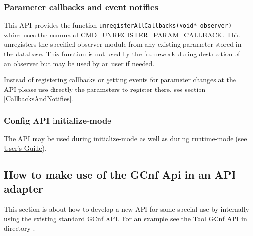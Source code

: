 \subsubsection{Parameter callbacks and event notifies}

This API provides the function \lstinline|unregisterAllCallbacks(void* observer)| which uses the \GreenControl command CMD\_UNREGISTER\_PARAM\_CALLBACK. This unregisters the specified observer module from any existing parameter stored in the database. This function is not used by the framework during destruction of an observer but may be used by an user if needed.

 Instead of registering callbacks or getting events for parameter changes at the \GreenConfig API please use directly the parameters to register there, see section \ref{CallbacksAndNotifies}.

\subsubsection{Config API initialize-mode}
\label{ConfigAPIinitializeMode}
The \GreenConfig API may be used during initialize-mode as well as during runtime-mode (see \hyperlink{GCUsersGuide}{\GreenControl User's Guide}).




\subsection{How to make use of the GCnf Api in an API adapter}
This section is about how to develop a new API for some special use by internally using the existing standard GCnf API.
For an example see the Tool GCnf API in directory .

